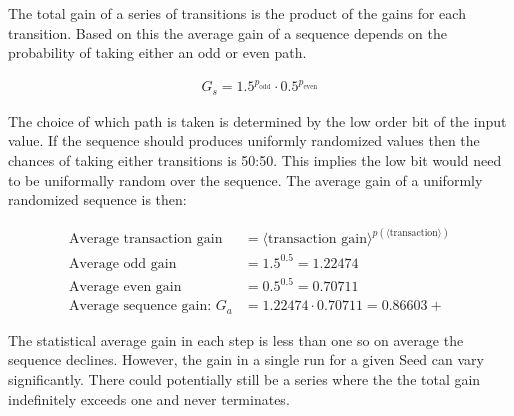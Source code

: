 \documentclass[preprint]{sigplanconf}
\begin{document}
The total gain of a series of transitions is the product of the gains for each transition. Based on this the average gain of a sequence depends on the probability of taking either an odd or even path.

\begin{align*}
    G_s = 1.5^{p_{\text{odd}}} \cdot 0.5^{p_{\text{even}}}
\end{align*}

The choice of which path is taken is determined by the low order bit of the input value. If the sequence should produces uniformly randomized values then the chances of taking either transitions is 50:50. This implies the low bit would need to be uniformally random over the sequence. The average gain of a uniformly randomized sequence is then:

\begin{align*}
    \text{Average transaction gain}    & = \langle \text{transaction gain} \rangle^{p(\langle \text{transaction} \rangle)} \\
    \text{Average odd gain}            & = 1.5^{0.5} = 1.22474                                                             \\
    \text{Average even gain}           & = 0.5^{0.5} = 0.70711                                                             \\
    \text{Average sequence gain: } G_a & = 1.22474 \cdot 0.70711 = 0.86603+
\end{align*}

The statistical average gain in each step is less than one so on average the sequence declines. However, the gain in a single run for a given Seed can vary significantly. There could potentially still be a series where the the total gain indefinitely exceeds one and never terminates.
\end{document}
